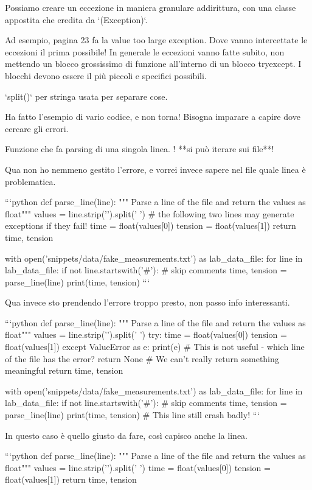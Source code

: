 \documentclass[10pt, a4paper, twosided, titlepage, draft]{book}
\begin{document}
Possiamo creare un eccezione in maniera granulare addirittura, con una classe appostita che eredita da `(Exception)`.

Ad esempio, pagina 23 fa la value too large exception.
Dove vanno intercettate le eccezioni il prima possibile!
In generale le eccezioni vanno fatte subito, non mettendo un blocco grossissimo di funzione all'interno di un blocco tryexcept. I blocchi devono essere il più piccoli e specifici possibili.

`split()` per stringa usata per separare cose.

Ha fatto l'esempio di vario codice, e non torna! Bisogna imparare a capire dove cercare gli errori.

Funzione che fa parsing di una singola linea. ! **si può iterare sui file**!

Qua non ho nemmeno gestito l'errore, e vorrei invece sapere nel file quale linea è problematica.

```python
def parse_line(line):
""" Parse a line of the file and return the values as float"""
values = line.strip(’\n’).split(’ ’)
# the following two lines may generate exceptions if they fail!
time = float(values[0])
tension = float(values[1])
return time, tension

with open(’snippets/data/fake_measurements.txt’) as lab_data_file:
for line in lab_data_file:
if not line.startswith(’#’): # skip comments
time, tension = parse_line(line)
print(time, tension)
```

Qua invece sto prendendo l'errore troppo presto, non passo info interessanti.

```python
def parse_line(line):
""" Parse a line of the file and return the values as float"""
values = line.strip(’\n’).split(’ ’)
try:
time = float(values[0])
tension = float(values[1])
except ValueError as e:
print(e) # This is not useful - which line of the file has the error?
return None # We can’t really return something meaningful
return time, tension

with open(’snippets/data/fake_measurements.txt’) as lab_data_file:
for line in lab_data_file:
if not line.startswith(’#’): # skip comments
time, tension = parse_line(line)
print(time, tension) # This line still crash badly!
```

In questo caso è quello giusto da fare, così capisco anche la linea.

```python
def parse_line(line):
""" Parse a line of the file and return the values as float"""
values = line.strip(’\n’).split(’ ’)
time = float(values[0])
tension = float(values[1])
return time, tension
\end{document}
